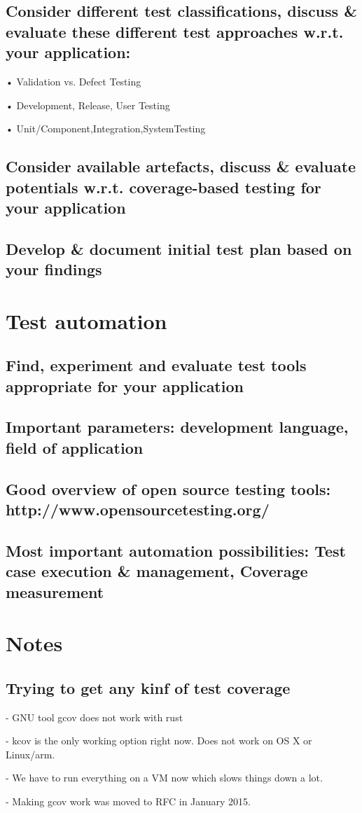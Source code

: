 \documentclass{scrartcl}
\begin{document}
\subsection{Consider different test classifications, discuss \& evaluate these different test approaches w.r.t. your application:}

• Validation vs. Defect Testing

• Development, Release, User Testing

• Unit/Component,Integration,SystemTesting

\subsection{Consider available artefacts, discuss \& evaluate potentials w.r.t. coverage-based testing for your application}

\subsection{Develop \& document initial test plan based on your findings}

\section{Test automation}

\subsection*{Find, experiment and evaluate test tools appropriate for your application}

\subsection*{Important parameters: development language, field of application}

\subsection*{Good overview of open source testing tools: http://www.opensourcetesting.org/}

\subsection*{Most important automation possibilities: Test case execution \& management, Coverage measurement}

\section{Notes}

\subsection*{Trying to get any kinf of test coverage}
- GNU tool gcov does not work with rust

- kcov is the only working option right now. Does not work on OS X or Linux/arm.

- We have to run everything on a VM now which slows things down a lot.

- Making gcov work was moved to RFC in January 2015.
\end{document}

